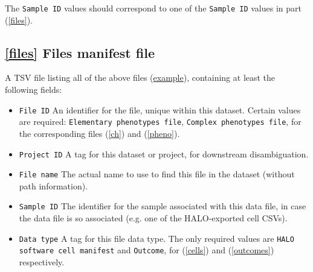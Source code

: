 \documentclass[14pt]{article}
\begin{document}
The \colorbox{yellow!25}{\texttt{Sample ID}} values should correspond to one of the \colorbox{yellow!25}{\texttt{Sample ID}} values in part (\ref{files}).

\subsection*{\ref{files} Files manifest file} A TSV file listing all of the above files (\href{https://github.com/nadeemlab/SPT/blob/main/tests/data/file_manifest.tsv}{example}), containing at least the following fields:

\begin{itemize}
  \itemsep0em
  \item[]{\colorbox{yellow!25}{\texttt{File ID}} \hspace{0.5pc} An identifier for the file, unique within this dataset. Certain values are required: \colorbox{gray!20}{\texttt{Elementary phenotypes file}}, \colorbox{gray!20}{\texttt{Complex phenotypes file}}, for the corresponding files (\ref{ch}) and (\ref{pheno}).}
  \item[]{\colorbox{yellow!25}{\texttt{Project ID}} \hspace{0.5pc} A tag for this dataset or project, for downstream disambiguation.}
  \item[]{\colorbox{yellow!25}{\texttt{File name}} \hspace{0.5pc} The actual name to use to find this file in the dataset (without path information).}
  \item[]{\colorbox{yellow!25}{\texttt{Sample ID}} \hspace{0.5pc} The identifier for the sample associated with this data file, in case the data file is so associated (e.g. one of the HALO-exported cell CSVs).}
  \item[]{\colorbox{yellow!25}{\texttt{Data type}} \hspace{0.5pc} A tag for this file data type. The only required values are \colorbox{gray!20}{\texttt{HALO software cell manifest}} and \colorbox{gray!20}{\texttt{Outcome}}, for (\ref{cells}) and (\ref{outcomes}) respectively.}
\end{itemize}
\end{document}
